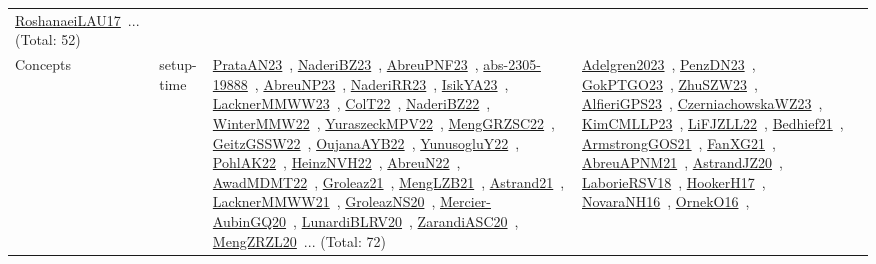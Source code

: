{\begin{longtable}{lp{3cm}>{\raggedright\arraybackslash}p{6cm}>{\raggedright\arraybackslash}p{6cm}>{\raggedright\arraybackslash}p{8cm}}
\href{../works/RoshanaeiLAU17.pdf}{RoshanaeiLAU17}~\cite{RoshanaeiLAU17}... (Total: 52)\\
\index{setup-time}\index{Concepts!setup-time}Concepts & setup-time & \href{../works/PrataAN23.pdf}{PrataAN23}~\cite{PrataAN23}, \href{../works/NaderiBZ23.pdf}{NaderiBZ23}~\cite{NaderiBZ23}, \href{../works/AbreuPNF23.pdf}{AbreuPNF23}~\cite{AbreuPNF23}, \href{../works/abs-2305-19888.pdf}{abs-2305-19888}~\cite{abs-2305-19888}, \href{../works/AbreuNP23.pdf}{AbreuNP23}~\cite{AbreuNP23}, \href{../works/NaderiRR23.pdf}{NaderiRR23}~\cite{NaderiRR23}, \href{../works/IsikYA23.pdf}{IsikYA23}~\cite{IsikYA23}, \href{../works/LacknerMMWW23.pdf}{LacknerMMWW23}~\cite{LacknerMMWW23}, \href{../works/ColT22.pdf}{ColT22}~\cite{ColT22}, \href{../works/NaderiBZ22.pdf}{NaderiBZ22}~\cite{NaderiBZ22}, \href{../works/WinterMMW22.pdf}{WinterMMW22}~\cite{WinterMMW22}, \href{../works/YuraszeckMPV22.pdf}{YuraszeckMPV22}~\cite{YuraszeckMPV22}, \href{../works/MengGRZSC22.pdf}{MengGRZSC22}~\cite{MengGRZSC22}, \href{../works/GeitzGSSW22.pdf}{GeitzGSSW22}~\cite{GeitzGSSW22}, \href{../works/OujanaAYB22.pdf}{OujanaAYB22}~\cite{OujanaAYB22}, \href{../works/YunusogluY22.pdf}{YunusogluY22}~\cite{YunusogluY22}, \href{../works/PohlAK22.pdf}{PohlAK22}~\cite{PohlAK22}, \href{../works/HeinzNVH22.pdf}{HeinzNVH22}~\cite{HeinzNVH22}, \href{../works/AbreuN22.pdf}{AbreuN22}~\cite{AbreuN22}, \href{../works/AwadMDMT22.pdf}{AwadMDMT22}~\cite{AwadMDMT22}, \href{../works/Groleaz21.pdf}{Groleaz21}~\cite{Groleaz21}, \href{../works/MengLZB21.pdf}{MengLZB21}~\cite{MengLZB21}, \href{../works/Astrand21.pdf}{Astrand21}~\cite{Astrand21}, \href{../works/LacknerMMWW21.pdf}{LacknerMMWW21}~\cite{LacknerMMWW21}, \href{../works/GroleazNS20.pdf}{GroleazNS20}~\cite{GroleazNS20}, \href{../works/Mercier-AubinGQ20.pdf}{Mercier-AubinGQ20}~\cite{Mercier-AubinGQ20}, \href{../works/LunardiBLRV20.pdf}{LunardiBLRV20}~\cite{LunardiBLRV20}, \href{../works/ZarandiASC20.pdf}{ZarandiASC20}~\cite{ZarandiASC20}, \href{../works/MengZRZL20.pdf}{MengZRZL20}~\cite{MengZRZL20}... (Total: 72) & \href{../works/Adelgren2023.pdf}{Adelgren2023}~\cite{Adelgren2023}, \href{../works/PenzDN23.pdf}{PenzDN23}~\cite{PenzDN23}, \href{../works/GokPTGO23.pdf}{GokPTGO23}~\cite{GokPTGO23}, \href{../works/ZhuSZW23.pdf}{ZhuSZW23}~\cite{ZhuSZW23}, \href{../works/AlfieriGPS23.pdf}{AlfieriGPS23}~\cite{AlfieriGPS23}, \href{../works/CzerniachowskaWZ23.pdf}{CzerniachowskaWZ23}~\cite{CzerniachowskaWZ23}, \href{../works/KimCMLLP23.pdf}{KimCMLLP23}~\cite{KimCMLLP23}, \href{../works/LiFJZLL22.pdf}{LiFJZLL22}~\cite{LiFJZLL22}, \href{../works/Bedhief21.pdf}{Bedhief21}~\cite{Bedhief21}, \href{../works/ArmstrongGOS21.pdf}{ArmstrongGOS21}~\cite{ArmstrongGOS21}, \href{../works/FanXG21.pdf}{FanXG21}~\cite{FanXG21}, \href{../works/AbreuAPNM21.pdf}{AbreuAPNM21}~\cite{AbreuAPNM21}, \href{../works/AstrandJZ20.pdf}{AstrandJZ20}~\cite{AstrandJZ20}, \href{../works/LaborieRSV18.pdf}{LaborieRSV18}~\cite{LaborieRSV18}, \href{../works/HookerH17.pdf}{HookerH17}~\cite{HookerH17}, \href{../works/NovaraNH16.pdf}{NovaraNH16}~\cite{NovaraNH16}, \href{../works/OrnekO16.pdf}{OrnekO16}~\cite{OrnekO16}, 
\end{longtable}}
